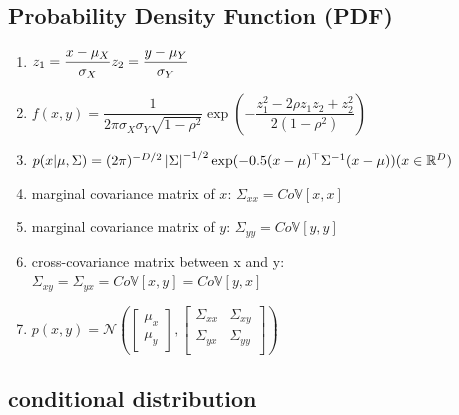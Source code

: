 \subsection{Probability Density Function (PDF) \cite{ism-1,mfml-1}} \label{Normal distribution: Bivariate/ Multivariate: PDF}

\begin{enumerate}[itemsep=0.5cm]
    \item $
        \hfill
        z_1 = \dfrac{x - \mu_X}{\sigma_X}
        \hfill
        z_2 = \dfrac{y - \mu_Y}{\sigma_Y}
        \hfill
    $ \hfill \cite{ism-1}
    
    \item $
        f(x,y)
        = \dfrac{1}{
            2\pi \sigma_X \sigma_Y \sqrt{1 - \rho^2}
        }
        \exp\left(
            -\dfrac{z_1^2 - 2\rho z_1z_2 + z_2^2}{2(1 - \rho^2)}
        \right)
    $ \hfill \cite{ism-1}

    \item $
        p(x|\mu, \Sigma)
        = (2\pi)^{-D/2} \dabs{\Sigma}^{-1/2}
        \exp(
            -0.5(x - \mu)^\top\Sigma^{-1}(x - \mu)
        )
        \hfill
        (x \in \mathbb{R}^D)
    $ \hfill \cite{mfml-1}

    \item marginal covariance matrix of $x$: $
        \Sigma_{xx} = Co\mathbb{V}[x,x]
    $

    \item marginal covariance matrix of $y$: $
        \Sigma_{yy} = Co\mathbb{V}[y,y]
    $

    \item cross-covariance matrix between x and y: $
        \Sigma_{xy} = \Sigma_{yx} = Co\mathbb{V}[x,y] = Co\mathbb{V}[y,x]
    $

    \item $
        p(x,y)
        = \mathcal{N}\left(
            \begin{bmatrix}
                \mu_x \\ \mu_y
            \end{bmatrix},
            \begin{bmatrix}
                \Sigma_{xx} & \Sigma_{xy} \\ 
                \Sigma_{yx} & \Sigma_{yy} \\ 
            \end{bmatrix}
        \right)
    $ \hfill \cite{mfml-1}
\end{enumerate}

\subsection{conditional distribution \cite{mfml-1}} \label{Normal distribution: Bivariate/ Multivariate: conditional distribution}

